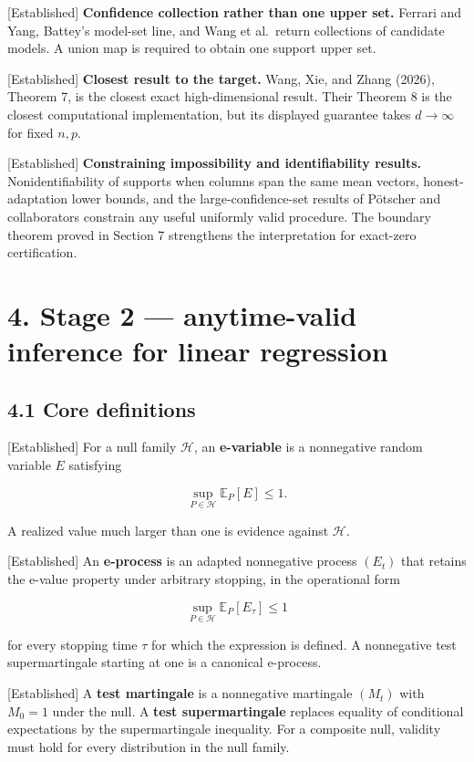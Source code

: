 \documentclass[
  english,
  11pt,
  a4paper,
]{article}
\begin{document}
{[}Established{]} \textbf{Confidence collection rather than one upper
set.} Ferrari and Yang, Battey's model-set line, and Wang et al.~return
collections of candidate models. A union map is required to obtain one
support upper set.

{[}Established{]} \textbf{Closest result to the target.} Wang, Xie, and
Zhang (2026), Theorem 7, is the closest exact high-dimensional result.
Their Theorem 8 is the closest computational implementation, but its
displayed guarantee takes $d\to\infty$ for fixed $n,p$.

{[}Established{]} \textbf{Constraining impossibility and identifiability
results.} Nonidentifiability of supports when columns span the same mean
vectors, honest-adaptation lower bounds, and the large-confidence-set
results of Pötscher and collaborators constrain any useful uniformly
valid procedure. The boundary theorem proved in Section 7 strengthens
the interpretation for exact-zero certification.

\section{4. Stage 2 --- anytime-valid inference for linear
regression}\label{stage-2-anytime-valid-inference-for-linear-regression}

\subsection{4.1 Core definitions}\label{core-definitions}

{[}Established{]} For a null family $\mathcal H$, an
\textbf{e-variable} is a nonnegative random variable $E$ satisfying

$$
\sup_{P\in\mathcal H}\mathbb E_P[E]\le1.
$$

A realized value much larger than one is evidence against
$\mathcal H$.

{[}Established{]} An \textbf{e-process} is an adapted nonnegative
process $(E_t)$ that retains the e-value property under arbitrary
stopping, in the operational form

$$
\sup_{P\in\mathcal H}\mathbb E_P[E_\tau]\le1
$$

for every stopping time $\tau$ for which the expression is defined. A
nonnegative test supermartingale starting at one is a canonical
e-process.

{[}Established{]} A \textbf{test martingale} is a nonnegative martingale
$(M_t)$ with $M_0=1$ under the null. A \textbf{test supermartingale}
replaces equality of conditional expectations by the supermartingale
inequality. For a composite null, validity must hold for every
distribution in the null family.
\end{document}

